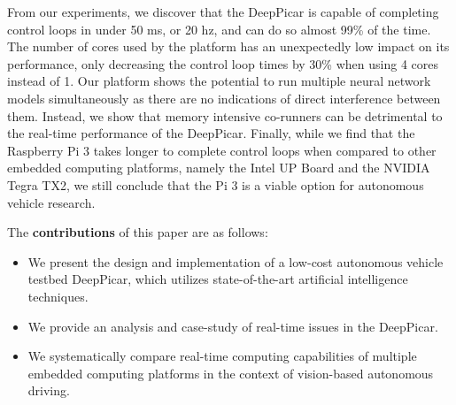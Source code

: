From our experiments, we discover that the DeepPicar is capable of 
completing control loops in under 50 ms, or 20 hz, and can do so 
almost 99\% of the time. The number of cores used by the platform has 
an unexpectedly low impact on its performance, only decreasing the 
control loop times by 30\% when using 4 cores instead of 1.  Our 
platform shows the potential to run multiple neural network models 
simultaneously as there are no indications of direct interference 
between them. Instead, we show that memory intensive co-runners can 
be detrimental to the real-time performance of the DeepPicar. 
Finally, while we find that the Raspberry Pi 3 takes longer to 
complete control loops when compared to other embedded computing 
platforms, namely the Intel UP Board and the NVIDIA Tegra TX2, we 
still conclude that the Pi 3 is a viable option for autonomous 
vehicle research.

The {\bf contributions} of this paper are as follows:
\begin{itemize}
  \item We present the design and implementation of a
    low-cost autonomous vehicle testbed DeepPicar, which utilizes
    state-of-the-art artificial intelligence techniques.
  \item We provide an analysis and case-study of real-time issues in the
    DeepPicar.
  \item We systematically compare real-time computing capabilities of
    multiple embedded computing platforms in the context of
    vision-based autonomous driving.
\end{itemize}




